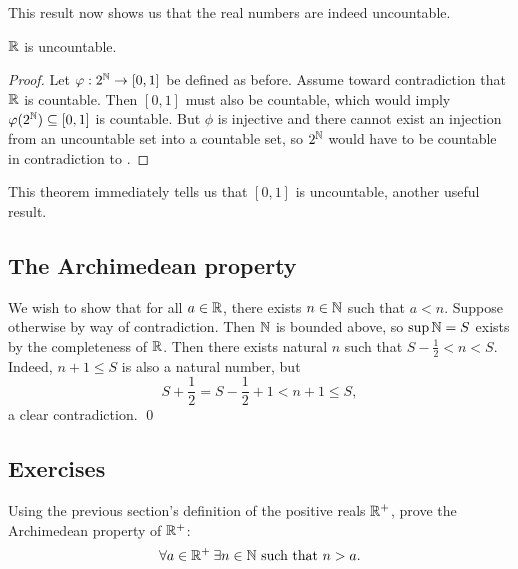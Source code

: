 \documentclass[master.tex]{subfiles}
\begin{document}
    This result now shows us that the real numbers are indeed uncountable.
    \begin{theorem}[label=r-uncountable]
        $\mathbb{R}$ is uncountable.
        \tcblower
        \begin{proof}
            Let $\varphi : 2^{\mathbb{N}} \rightarrow [0, 1]$ be defined as before.
            Assume toward contradiction that $\mathbb{R}$ is countable.
            Then $[0, 1]$ must also be countable, which would imply $\varphi(2^{\mathbb{N}}) \subseteq [0, 1]$ is countable.
            But $\phi$ is injective and there cannot exist an injection from an uncountable set into a countable set, so $2^{\mathbb{N}}$ would have to be countable in contradiction to .
        \end{proof}
    \end{theorem}
    This theorem immediately tells us that $[0, 1]$ is uncountable, another useful result.

    \subsection{The Archimedean property}
    We wish to show that for all $a \in \mathbb{R}$, there exists $n \in \mathbb{N}$ such that $a < n$.
    Suppose otherwise by way of contradiction.
    Then $\mathbb{N}$ is bounded above, so $\sup{\mathbb{N}} = S$ exists by the completeness of $\mathbb{R}$.
    Then there exists natural $n$ such that $S - \frac{1}{2} < n < S$.
    Indeed, $n + 1 \leq S$ is also a natural number, but
    \[
        S + \frac{1}{2} = S - \frac{1}{2} + 1 < n + 1 \leq S
    ,\]
    a clear contradiction. \qed


    \subsection*{Exercises}
    \begin{exercises}
        \item Using the previous section's definition of the positive reals $\mathbb{R}^{+}$, prove the Archimedean property of $\mathbb{R}^{+}$:
        \[
            \forall a \in \mathbb{R}^{+} \: \exists n \in \mathbb{N} \text{ such that } n > a
        .\]
    \end{exercises}
\end{document}
